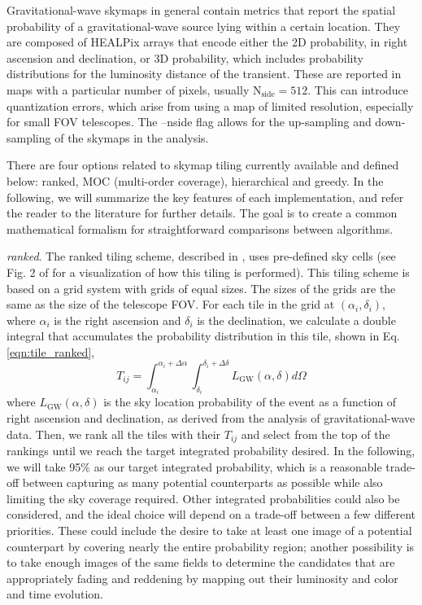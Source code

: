 \documentclass[twocolumn]{aastex62}
\begin{document}
Gravitational-wave skymaps in general contain metrics that report the spatial probability of a gravitational-wave source lying within a certain location.
They are composed of HEALPix arrays that encode either the 2D probability, in right ascension and declination, or 3D probability, which includes probability distributions for the luminosity distance of the transient.
These are reported in maps with a particular number of pixels, usually $\textrm{N}_\textrm{side} = 512$. 
This can introduce quantization errors, which arise from using a map of limited resolution, especially for small FOV telescopes. 
The --nside flag allows for the up-sampling and down-sampling of the skymaps in the analysis.

There are four options related to skymap tiling currently available and defined below: ranked, MOC (multi-order coverage), hierarchical and greedy.
In the following, we will summarize the key features of each implementation, and refer the reader to the literature for further details.
The goal is to create a common mathematical formalism for straightforward comparisons between algorithms.

\emph{ranked}. The ranked tiling scheme, described in \cite{GhBl2016}, uses pre-defined sky cells (see Fig. 2 of \cite{GhBl2016} for a visualization of how this tiling is performed). This tiling scheme is based on a grid system with grids of equal sizes. The sizes of the grids are the same as the size of the telescope FOV. For each tile in the grid at $(\alpha_i, \delta_i)$, where $\alpha_i$ is the right ascension and $\delta_i$ is the declination, we calculate a double integral that accumulates the probability distribution in this tile, shown in Eq.\ref{eqn:tile_ranked},
\begin{equation}\label{eqn:tile_ranked}
T_{ij} = \int_{\alpha_i}^{\alpha_i+\Delta \alpha}\int_{\delta_i}^{\delta_i+\Delta \delta}L_\textrm{GW}(\alpha,\delta)d\Omega
\end{equation}
where $L_\textrm{GW}(\alpha,\delta)$ is the sky location probability of the event as a function of right ascension and declination, as derived from the analysis of gravitational-wave data.
Then, we rank all the tiles with their $T_{ij}$ and select from the top of the rankings until we reach the target integrated probability desired.
In the following, we will take 95\% as our target integrated probability, which is a reasonable trade-off between capturing as many potential counterparts as possible while also limiting the sky coverage required. Other integrated probabilities could also be considered, and the ideal choice will depend on a trade-off between a few different priorities. These could include the desire to take at least one image of a potential counterpart by covering nearly the entire probability region; another possibility is to take enough images of the same fields to determine the candidates that are appropriately fading and reddening by mapping out their luminosity and color and time evolution.
\end{document}
